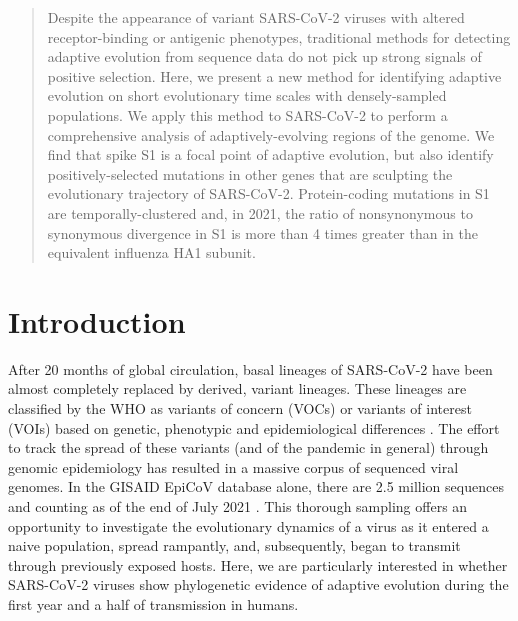 \documentclass[11pt,oneside,letterpaper]{article}
\begin{document}

\bigskip


\smallskip

\bigskip
\normalsize

\begin{abstract}
Despite the appearance of variant SARS-CoV-2 viruses with altered receptor-binding or antigenic phenotypes, traditional methods for detecting adaptive evolution from sequence data do not pick up strong signals of positive selection.
Here, we present a new method for identifying adaptive evolution on short evolutionary time scales with densely-sampled populations.
We apply this method to SARS-CoV-2 to perform a comprehensive analysis of adaptively-evolving regions of the genome.
We find that spike S1 is a focal point of adaptive evolution, but also identify positively-selected mutations in other genes that are sculpting the evolutionary trajectory of SARS-CoV-2.
Protein-coding mutations in S1 are temporally-clustered and, in 2021, the ratio of nonsynonymous to synonymous divergence in S1 is more than 4 times greater than in the equivalent influenza HA1 subunit.
\end{abstract}

\smallskip

\section*{Introduction}
After 20 months of global circulation, basal lineages of SARS-CoV-2 have been almost completely replaced by derived, variant lineages.
These lineages are classified by the WHO as variants of concern (VOCs) or variants of interest (VOIs) based on genetic, phenotypic and epidemiological differences \cite{Konings2021-vm}.
The effort to track the spread of these variants (and of the pandemic in general) through genomic epidemiology has resulted in a massive corpus of sequenced viral genomes.
In the GISAID EpiCoV database alone, there are 2.5 million sequences and counting as of the end of July 2021 \cite{Shu2017-ql}.
This thorough sampling offers an opportunity to investigate the evolutionary dynamics of a virus as it entered a naive population, spread rampantly, and, subsequently, began to transmit through previously exposed hosts.
Here, we are particularly interested in whether SARS-CoV-2 viruses show phylogenetic evidence of adaptive evolution during the first year and a half of transmission in humans.
\end{document}
